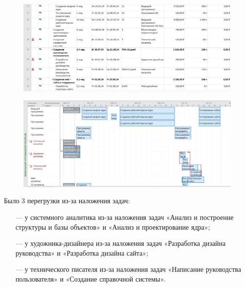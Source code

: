 \begin{figure}[h!]
	\begin{center}
		\includegraphics[scale=0.55]{inc/img/p_11.png}
	\end{center}
	\captionsetup{justification=centering}
	\label{fig:u3}
\end{figure}

\begin{figure}[h!]
	\begin{center}
		\includegraphics[scale=0.5]{inc/img/p_12.png}
	\end{center}
	\captionsetup{justification=centering}
	\label{fig:u3}
\end{figure}

\newpage

Было 3 перегрузки из-за наложения задач:
\begin{itemize}
    \item[---] у системного аналитика из-за наложения задач «Анализ и построение структуры и базы объектов» и «Анализ и проектирование ядра»;
    \item[---] у художника-дизайнера из-за наложения задач «Разработка дизайна руководства» и «Разработка дизайна сайта»;
    \item[---] у технического писателя из-за наложения задач «Написание руководства пользователя» и «Создание справочной системы».
\end{itemize}

